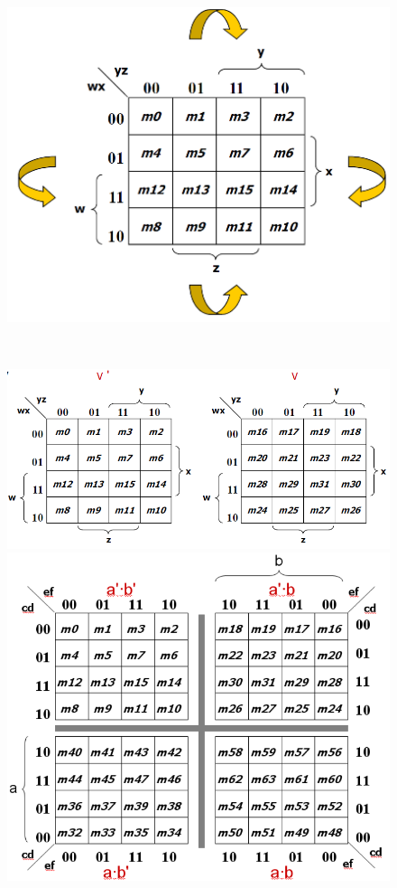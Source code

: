 \documentclass[12pt]{article}
\theoremstyle{definition}
\begin{document}
\begin{figure}[h]
\begin{minipage}{0.43\textwidth}\includegraphics[width = \textwidth]{4_14.png}\end{minipage}\\
\begin{minipage}{0.49\textwidth}\includegraphics[width = \textwidth]{4_15.png}\end{minipage}\hfill
\begin{minipage}{0.49\textwidth}\includegraphics[width = \textwidth]{4_16.png}\end{minipage}

\end{figure}
\end{document}
